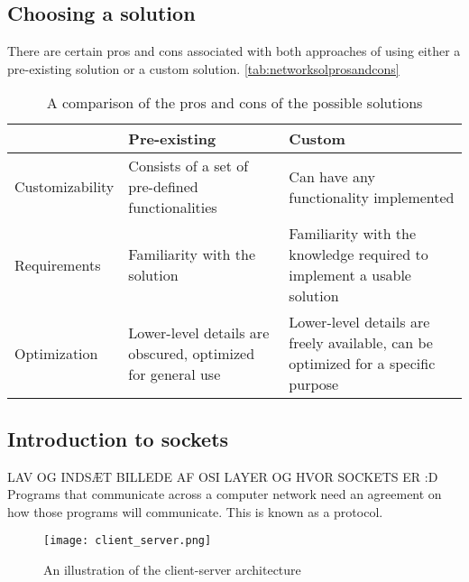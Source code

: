 \subsection{Choosing a solution}
There are certain pros and cons associated with both approaches of using either a pre-existing solution or a custom solution.
\autoref{tab:networksolprosandcons} 
\begin{table}[]
    \begin{tabular}{|l|l|l|}
    \hline
                    & Pre-existing                                                & Custom                                                                            \\ \hline
    Customizability & Consists of a set of pre-defined functionalities            & Can have any functionality implemented                                            \\ \hline
    Requirements    & Familiarity with the solution                               & Familiarity with the knowledge required to implement a usable solution            \\ \hline
    Optimization    & Lower-level details are obscured, optimized for general use & Lower-level details are freely available, can be optimized for a specific purpose \\ \hline
    \end{tabular}
    \caption{A comparison of the pros and cons of the possible solutions}
    \label{tab:networksolprosandcons}
    \end{table}

\subsection{Introduction to sockets}
LAV OG INDSÆT BILLEDE AF OSI LAYER OG HVOR SOCKETS ER :D
Programs that communicate across a computer network need an agreement on how those programs will communicate.
This is known as a protocol.

\begin{figure}[H]
    \centering
    \texttt{[image: client\_server.png]}
    \caption{An illustration of the client-server architecture}
    \label{fig:client-server}
\end{figure}

